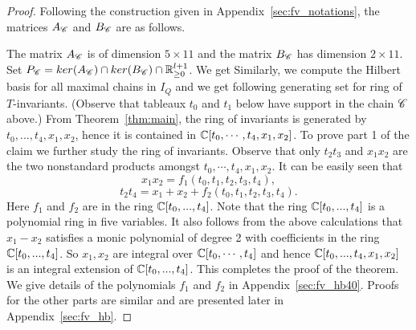 \begin{proof}
 \unskip 
 Following the construction given in Appendix~\ref{sec:fv_notations}, the matrices \(A_{\mathscr{C}}\) and \(B_{\mathscr{C}}\) are as follows.

\unskip
    The matrix \(A_{\mathscr{C}}\) is of dimension \(5 \times 11 \) and the matrix \(B_{\mathscr{C}}\) has dimension \(2 \times 11\). 
Set \(P_{\mathscr{C}} = ker(A_{\mathscr{C}}) \cap ker(B_{\mathscr{C}}) \cap \mathbb{R}_{\ge 0}^{l+1}\). 
    We get 
\unskip
    Similarly, we compute the Hilbert basis for all maximal chains in \(I_{Q}\) and we get following generating set for ring of \(T\)-invariants. (Observe that tableaux \(t_0\) and \(t_1\) below have support in the chain \(\mathscr{C}\) above.)  
\unskip
    From Theorem~\ref{thm:main}, the ring of invariants is generated by \(t_0,...,t_4,x_1,x_2\), hence it is contained in \(\mathbb{C}[t_0,\cdots,t_4,x_1,x_2]\). 
    To prove part 1 of the claim we further study the ring of invariants. Observe that only \(t_2t_3\) and \(x_1x_2\) are the two nonstandard products amongst \(t_0,\cdots,t_4,x_1,x_2\).
    It can be easily seen that
    \[
        x_1x_2 = f_1(t_0,t_1,t_2,t_3,t_4), 
    \]
    \[
        t_2t_4 = x_1+x_2+f_2(t_0,t_1,t_2,t_3,t_4).
    \]
    Here $f_1$ and $f_2$ are in the ring \(\mathbb{C}[t_0,...,t_4]\).  Note that the ring \(\mathbb{C}[t_0,...,t_4]\) is a polynomial ring in five variables. It also follows from the above calculations that $x_1-x_2$ satisfies a monic polynomial of degree 2 with coefficients in the ring \(\mathbb{C}[t_0,...,t_4]\). So $x_1, x_2$ are integral over \(\mathbb{C}[t_0,\cdots,t_4]\) and hence \(\mathbb{C}[t_0,...,t_4,x_1,x_2]\) is an integral extension of \(\mathbb{C}[t_0,...,t_4]\). This completes the proof of the theorem.
We give details of the polynomials $f_1$ and $f_2$ in Appendix~\ref{sec:fv_hb40}. Proofs for the other parts are similar and are presented later in Appendix~\ref{sec:fv_hb}.

\end{proof}
